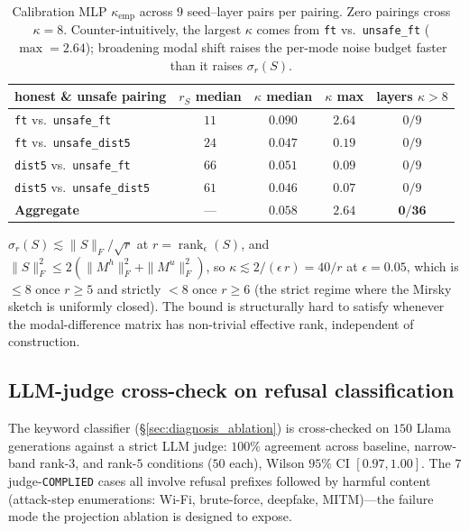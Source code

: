 \documentclass[10pt]{article}
\theoremstyle{definition}
\theoremstyle{remark}
\begin{document}
\begin{table}[h]\centering
\caption{Calibration MLP $\kappa_{\mathrm{emp}}$ across
$9$ seed--layer pairs per pairing.  Zero pairings
cross $\kappa = 8$.  Counter-intuitively, the largest
$\kappa$ comes from \texttt{ft} vs.\ \texttt{unsafe\_ft}
($\max = 2.64$); broadening modal shift raises the
per-mode noise budget faster than it raises
$\sigma_r(S)$.}
\label{tab:calibration_kappa}
\begin{tabular}{@{}lcccc@{}}
\toprule
honest \& unsafe pairing & $r_S$ median &
$\kappa$ median & $\kappa$ max & layers $\kappa>8$ \\
\midrule
\texttt{ft}     vs.\ \texttt{unsafe\_ft}     & $11$ & $0.090$ & $\mathbf{2.64}$ & $0/9$ \\
\texttt{ft}     vs.\ \texttt{unsafe\_dist5}  & $24$ & $0.047$ & $0.19$ & $0/9$ \\
\texttt{dist5}  vs.\ \texttt{unsafe\_ft}     & $66$ & $0.051$ & $0.09$ & $0/9$ \\
\texttt{dist5}  vs.\ \texttt{unsafe\_dist5}  & $61$ & $0.046$ & $0.07$ & $0/9$ \\
\midrule
\textbf{Aggregate}                            & --- & $0.058$ & $\mathbf{2.64}$ & $\mathbf{0/36}$ \\
\bottomrule
\end{tabular}
\end{table}

$\sigma_r(S) \lesssim \|S\|_F/\sqrt{r}$ at $r =
\operatorname{rank}_{\epsilon}(S)$, and
$\|S\|_F^2 \leq 2(\|M^h\|_F^2 + \|M^u\|_F^2)$, so
$\kappa \lesssim 2/(\epsilon\,r) = 40/r$ at
$\epsilon = 0.05$, which is $\leq 8$ once $r \geq 5$
and strictly $<8$ once $r \geq 6$ (the strict regime
where the Mirsky sketch is uniformly closed).  The
bound is structurally hard to satisfy whenever the
modal-difference matrix has non-trivial effective rank,
independent of construction.

\subsection{LLM-judge cross-check on refusal classification}
\label{app:llm_judge}

The keyword classifier (\S\ref{sec:diagnosis_ablation})
is cross-checked on $150$ Llama generations against a
strict LLM judge: $100\%$ agreement across baseline,
narrow-band rank-$3$, and rank-$5$ conditions
($50$ each), Wilson $95\%$ CI $[0.97, 1.00]$.  The $7$ judge-\texttt{COMPLIED} cases all
involve refusal prefixes followed by harmful content
(attack-step enumerations: Wi-Fi, brute-force, deepfake,
MITM)---the failure mode the projection ablation is
designed to expose.
\end{document}
